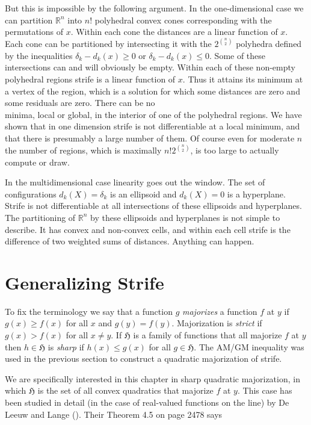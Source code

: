 \documentclass[
  12pt,
  letterpaper,
  DIV=11,
  numbers=noendperiod]{scrartcl}
\newcommand{\sectionbreak}{\pagebreak}
\begin{document}
But this is impossible by the following argument. In the one-dimensional
case we can partition \(\mathbb{R}^n\) into \(n!\) polyhedral convex
cones corresponding with the permutations of \(x\). Within each cone the
distances are a linear function of \(x\). Each cone can be partitioned
by intersecting it with the \(2^\binom{n}{2}\) polyhedra defined by the
inequalities \(\delta_k-d_k(x)\geq 0\) or \(\delta_k-d_k(x)\leq 0\).
Some of these intersections can and will obviously be empty. Within each
of these non-empty polyhedral regions strife is a linear function of
\(x\). Thus it attains its minimum at a vertex of the region, which is a
solution for which some distances are zero and some residuals are zero.
There can be no\\
minima, local or global, in the interior of one of the polyhedral
regions. We have shown that in one dimension strife is not
differentiable at a local minimum, and that there is presumably a large
number of them. Of course even for moderate \(n\) the number of regions,
which is maximally \(n!2^\binom{n}{2}\), is too large to actually
compute or draw.

In the multidimensional case linearity goes out the window. The set of
configurations \(d_k(X)=\delta_k\) is an ellipsoid and \(d_k(X)=0\) is a
hyperplane. Strife is not differentiable at all intersections of these
ellipsoids and hyperplanes. The partitioning of \(\mathbb{R}^n\) by
these ellipsoids and hyperplanes is not simple to describe. It has
convex and non-convex cells, and within each cell strife is the
difference of two weighted sums of distances. Anything can happen.

\sectionbreak

\section{Generalizing Strife}\label{generalizing-strife}

To fix the terminology we say that a function \(g\) \emph{majorizes} a
function \(f\) at \(y\) if \(g(x)\geq f(x)\) for all \(x\) and
\(g(y)=f(y)\). Majorization is \emph{strict} if \(g(x)>f(x)\) for all
\(x\not= y\). If \(\mathfrak{H}\) is a family of functions that all
majorize \(f\) at \(y\) then \(h\in\mathfrak{H}\) is \emph{sharp} if
\(h(x)\leq g(x)\) for all \(g\in\mathfrak{H}\). The AM/GM inequality was
used in the previous section to construct a quadratic majorization of
strife.

We are specifically interested in this chapter in sharp quadratic
majorization, in which \(\mathfrak{H}\) is the set of all convex
quadratics that majorize \(f\) at \(y\). This case has been studied in
detail (in the case of real-valued functions on the line) by De Leeuw
and Lange (). Their Theorem 4.5
on page 2478 says
\end{document}
